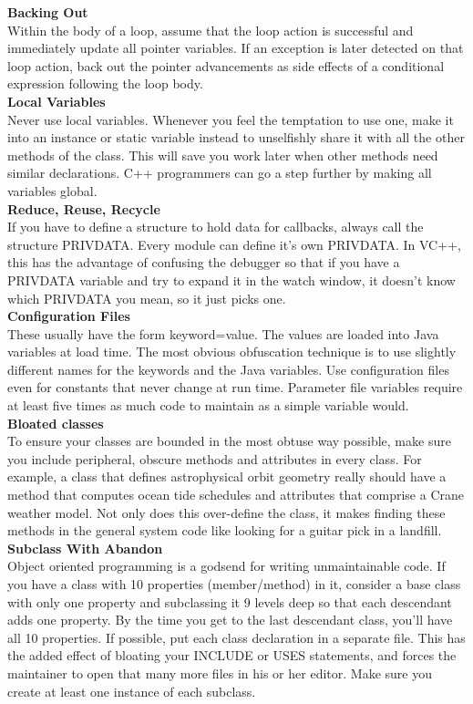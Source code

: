 \documentclass[11pt,twoside,a4paper]{article}
\begin{document}
\textbf{Backing Out}~\\
Within the body of a loop, assume that the loop action is successful and immediately update all pointer variables. If an exception is later detected on that loop action, back out the pointer advancements as side effects of a conditional expression following the loop body.~\\ 

\textbf{Local Variables}~\\
Never use local variables. Whenever you feel the temptation to use one, make it into an instance or static variable instead to unselfishly share it with all the other methods of the class. This will save you work later when other methods need similar declarations. C++ programmers can go a step further by making all variables global.~\\ 

\textbf{Reduce, Reuse, Recycle}~\\
If you have to define a structure to hold data for callbacks, always call the structure PRIVDATA. Every module can define it's own PRIVDATA. In VC++, this has the advantage of confusing the debugger so that if you have a PRIVDATA variable and try to expand it in the watch window, it doesn't know which PRIVDATA you mean, so it just picks one.~\\ 

\textbf{Configuration Files}~\\
These usually have the form keyword=value. The values are loaded into Java variables at load time. The most obvious obfuscation technique is to use slightly different names for the keywords and the Java variables. Use configuration files even for constants that never change at run time. Parameter file variables require at least five times as much code to maintain as a simple variable would. ~\\

\textbf{Bloated classes}~\\
To ensure your classes are bounded in the most obtuse way possible, make sure you include peripheral, obscure methods and attributes in every class. For example, a class that defines astrophysical orbit geometry really should have a method that computes ocean tide schedules and attributes that comprise a Crane weather model. Not only does this over-define the class, it makes finding these methods in the general system code like looking for a guitar pick in a landfill. ~\\

\textbf{Subclass With Abandon}~\\
Object oriented programming is a godsend for writing unmaintainable code. If you have a class with 10 properties (member/method) in it, consider a base class with only one property and subclassing it 9 levels deep so that each descendant adds one property. By the time you get to the last descendant class, you'll have all 10 properties. If possible, put each class declaration in a separate file. This has the added effect of bloating your INCLUDE or USES statements, and forces the maintainer to open that many more files in his or her editor. Make sure you create at least one instance of each subclass. ~\\
\end{document}
